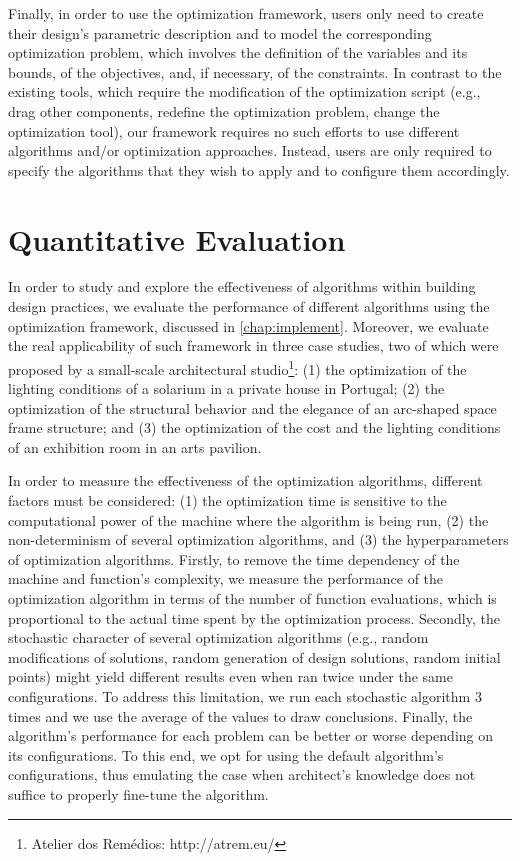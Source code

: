 Finally, in order to use the optimization framework, users only need to create their design's parametric description and to model the corresponding optimization problem, which involves the definition of the variables and its bounds, of the objectives, and, if necessary, of the constraints. In contrast to the existing tools, which require the modification of the optimization script (e.g., drag other components, redefine the optimization problem, change the optimization tool), our framework requires no such efforts to use different algorithms and/or optimization approaches. Instead, users are only required to specify the algorithms that they wish to apply and to configure them accordingly.

\section{Quantitative Evaluation}
\label{sec:quantitative}

In order to study and explore the effectiveness of algorithms within building design practices, we evaluate the performance of different algorithms using the optimization framework, discussed in \cref{chap:implement}. Moreover, we evaluate the real applicability of such framework in three case studies, two of which were proposed by a small-scale architectural studio\footnote{Atelier dos Remédios: http://atrem.eu/}: (1) the optimization of the lighting conditions of a solarium in a private house in Portugal; (2) the optimization of the structural behavior and the elegance of an arc-shaped space frame structure; and (3) the optimization of the cost and the lighting conditions of an exhibition room in an arts pavilion.   

In order to measure the effectiveness of the optimization algorithms, different factors must be considered: (1) the optimization time is sensitive to the computational power of the machine where the algorithm is being run, (2) the non-determinism of several optimization algorithms, and (3) the hyperparameters of optimization algorithms. Firstly, to remove the time dependency of the machine and function's complexity, we measure the performance of the optimization algorithm in terms of the number of function evaluations, which is proportional to the actual time spent by the optimization process. Secondly, the stochastic character of several optimization algorithms (e.g., random modifications of solutions, random generation of design solutions, random initial points) might yield different results even when ran twice under the same configurations. To address this limitation, we run each stochastic algorithm 3 times and we use the average of the values to draw conclusions. Finally, the algorithm's performance for each problem can be better or worse depending on its configurations. To this end, we opt for using the default algorithm's configurations, thus emulating the case when architect's knowledge does not suffice to properly fine-tune the algorithm.
 
